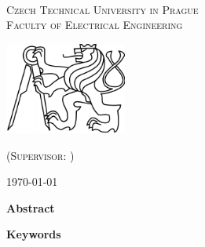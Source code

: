 \documentclass[a4paper,twoside,english,english,openright,cleardoublepage=empty,BCOR10mm,DIV11]{scrreprt}
\newcommand{\noun}[1]{\textsc{#1}}
\begin{document}
~\thispagestyle{empty}\begin{center}\vspace{10mm}


\textsf{\textsc{\noun{\LARGE Czech Technical University in Prague}}}\\
\vspace{0.5em}
\textsf{\textsc{\noun{\LARGE Faculty of Electrical Engineering}}}\\
\vspace*{1em}
\textsf{\textsc{\noun{\Large \Department}}}\vspace{15mm}


\includegraphics[width=0.3\textwidth]{lev}\vspace{15mm}

\textsf{\textsc{\noun{\huge \Subject}}}{\huge \par}

\vspace{10mm}


\textsf{\textsc{\noun{\LARGE \Title}}}{\LARGE \par}

\vspace*{\fill}

\textsf{\textsc{\noun{\large \AuthorName}}}{\large \par}
\textsf{\textsc{\noun{\large (Supervisor: \SupervisorName)}}}{\large \par}

\vspace{10mm}

\textsf{\textsc{\noun{\large \today}}}{\large \par}


\end{center} 



\vspace{10mm}

\clearpage{}
{\small \thispagestyle{plain} }{\small \par}
{\small \textbf{Abstract}  }{\small \par}
\vspace{5mm}
{\small \textbf{Keywords} \Keywords}{\small \par}
\vspace{5mm}
\clearpage{}
\thispagestyle{empty}{\small \tableofcontents{}%
\cleardoublepage{}
}{\small \par}
\end{document}
